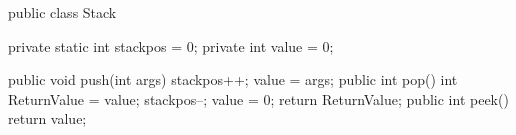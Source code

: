 public class Stack {
    private static int stackpos = 0;
    private int value = 0;

    public void push(int args) {
        stackpos++;
        value = args;
    }
    public int pop() {
        int ReturnValue = value;
        stackpos--;
        value = 0;
        return ReturnValue;
    }
    public int peek() {
        return value;
    }
}